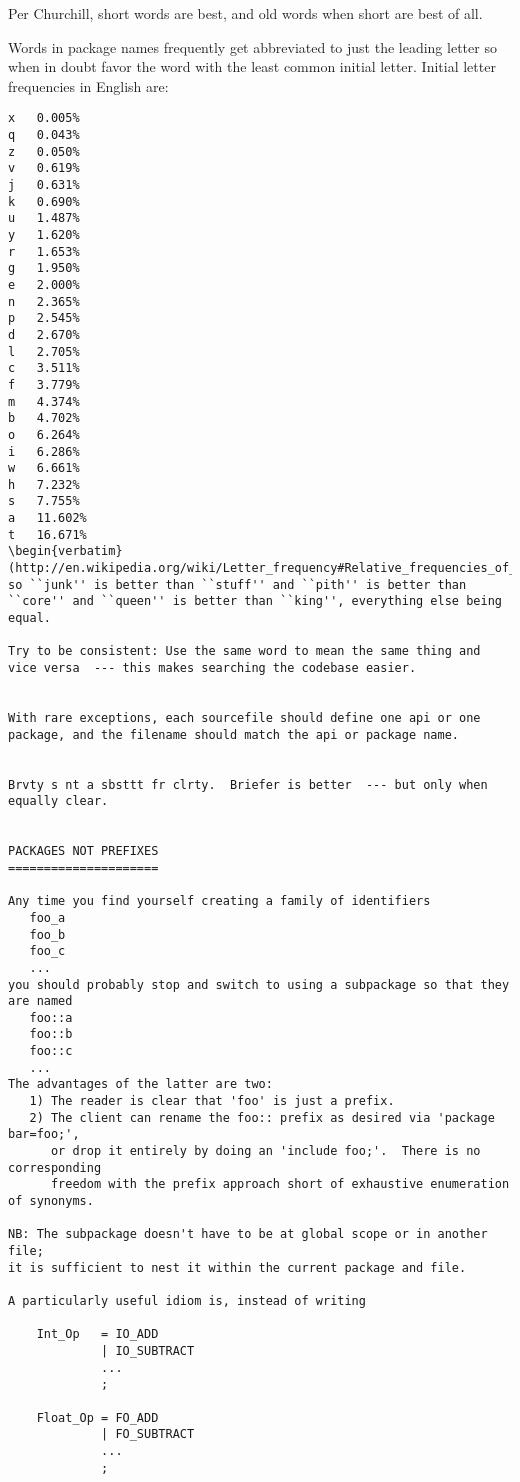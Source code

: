 Per Churchill, short words are best, and old words when short are best of all.

Words in package names frequently get abbreviated to just the leading letter so 
when in doubt favor the word with the least common initial letter.  Initial letter frequencies in English 
are:
\begin{verbatim}
x	0.005%
q	0.043%
z	0.050%
v	0.619%
j	0.631%
k	0.690%
u	1.487%
y	1.620%
r	1.653%
g	1.950%
e	2.000%
n	2.365%
p	2.545%
d	2.670%
l	2.705%
c	3.511%
f	3.779%
m	4.374%
b	4.702%
o	6.264%
i	6.286%
w	6.661%
h	7.232%
s	7.755%
a	11.602%
t	16.671%
\begin{verbatim}
(http://en.wikipedia.org/wiki/Letter_frequency#Relative_frequencies_of_the_first_letters_of_a_word_in_the_English_language)
so ``junk'' is better than ``stuff'' and ``pith'' is better than ``core'' and ``queen'' is better than ``king'', everything else being equal.

Try to be consistent: Use the same word to mean the same thing and 
vice versa  --- this makes searching the codebase easier.


With rare exceptions, each sourcefile should define one api or one package, and the filename should match the api or package name.


Brvty s nt a sbsttt fr clrty.  Briefer is better  --- but only when equally clear.


PACKAGES NOT PREFIXES
=====================

Any time you find yourself creating a family of identifiers 
   foo_a
   foo_b
   foo_c
   ...
you should probably stop and switch to using a subpackage so that they are named 
   foo::a
   foo::b
   foo::c
   ...
The advantages of the latter are two:
   1) The reader is clear that 'foo' is just a prefix.
   2) The client can rename the foo:: prefix as desired via 'package bar=foo;',
      or drop it entirely by doing an 'include foo;'.  There is no corresponding 
      freedom with the prefix approach short of exhaustive enumeration of synonyms.

NB: The subpackage doesn't have to be at global scope or in another file;
it is sufficient to nest it within the current package and file.

A particularly useful idiom is, instead of writing 

    Int_Op   = IO_ADD 
             | IO_SUBTRACT 
             ...
             ;

    Float_Op = FO_ADD 
             | FO_SUBTRACT 
             ...
             ;


\end{verbatim}

